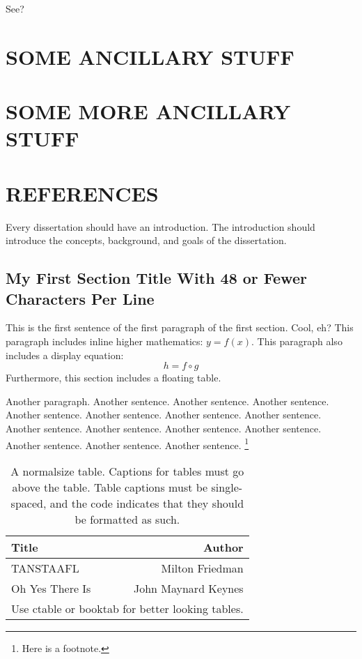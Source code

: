 \documentclass[12pt,econ]{sources/authesis}
\def\ssp{\def\baselinestretch{1.0}\large\normalsize}
\theoremstyle{definition}
\theoremstyle{definition}
\theoremstyle{definition}
\theoremstyle{remark}
\begin{document}
See?

\appendix

\chapter{SOME ANCILLARY STUFF}\label{some-ancillary-stuff}

\chapter{SOME MORE ANCILLARY STUFF}\label{some-more-ancillary-stuff}

\chapter*{REFERENCES}\label{references}

\noindent

\ssp

Every dissertation should have an introduction. The introduction should
introduce the concepts, background, and goals of the dissertation.

\section{\texorpdfstring{My First Section Title \newline With 48 or
Fewer Characters Per
Line}{My First Section Title With 48 or Fewer Characters Per Line}}\label{introduction-first-section}

This is the first sentence of the first paragraph of the first section.
Cool, eh? This paragraph includes inline higher mathematics: \(y=f(x)\).
This paragraph also includes a display equation:
\begin{equation}
h = f \circ g
\end{equation}
Furthermore, this section includes a floating table.

Another paragraph. Another sentence. Another sentence. Another sentence.
Another sentence. Another sentence. Another sentence. Another sentence.
Another sentence. Another sentence. Another sentence. Another sentence.
Another sentence. Another sentence. Another sentence. \footnote{
Here is a footnote.}
\begin{table}[h]\centering
\caption{A normalsize table.
Captions for tables must go above the table.
Table captions must be single-spaced,
and the code indicates that they should be formatted as such.}
\begin{tabular}{lr}\hline\hline
Title & Author \\ \hline
TANSTAAFL & Milton Friedman \\
Oh Yes There Is & John Maynard Keynes \\ \hline
\multicolumn{2}{c}{\small Use ctable or booktab for better looking tables.}
\end{tabular}
\end{table}
\end{document}
